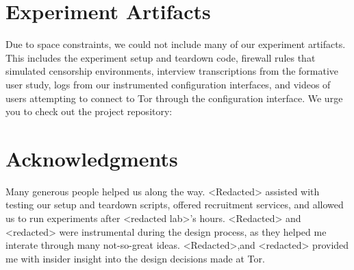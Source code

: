 \documentclass[USenglish,oneside,twocolumn]{article}
\begin{document}
\section {Experiment Artifacts} 
Due to space constraints, we could not include many of our experiment artifacts. This includes the experiment setup and teardown code, firewall rules that simulated censorship environments, interview transcriptions from the formative user study, logs from our instrumented configuration interfaces, and videos of users attempting to connect to Tor through the configuration interface. We urge you to check out the project repository: \\


\section {Acknowledgments}
Many generous people helped us along the way. <Redacted> assisted with testing our setup and teardown scripts, offered recruitment services, and allowed us to run experiments after <redacted lab>'s hours. <Redacted> and <redacted> were instrumental during the design process, as they helped me interate through many not-so-great ideas.  <Redacted>,and <redacted> provided me with insider insight into the design decisions made at Tor.




\appendix
\end{document}
